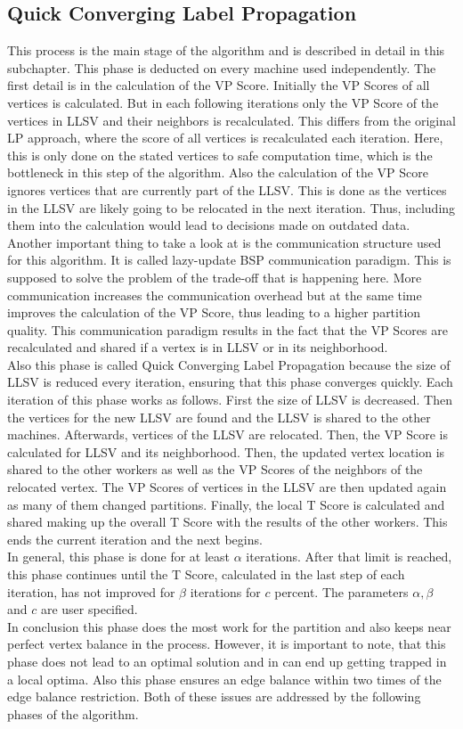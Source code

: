\documentclass[acmsmall,nonacm,screen,review]{acmart}
\begin{document}
\subsection{Quick Converging Label Propagation}
This process is the main stage of the algorithm and is described in detail in this subchapter. This phase is deducted on every machine used independently. The first detail is in the calculation of the VP Score. Initially the VP Scores of all vertices is calculated. But in each following iterations only the VP Score of the vertices in LLSV and their neighbors is recalculated. This differs from the original LP approach, where the score of all vertices is recalculated each iteration. Here, this is only done on the stated vertices to safe computation time, which is the bottleneck in this step of the algorithm. Also the calculation of the VP Score ignores vertices that are currently part of the LLSV. This is done as the vertices in the LLSV are likely going to be relocated in the next iteration. Thus, including them into the calculation would lead to decisions made on outdated data. \\
Another important thing to take a look at is the communication structure used for this algorithm. It is called lazy-update BSP communication paradigm. This is supposed to solve the problem of the trade-off that is happening here. More communication increases the communication overhead but at the same time improves the calculation of the VP Score, thus leading to a higher partition quality. This communication paradigm  results in the fact that the VP Scores are recalculated and shared if a vertex is in LLSV or in its neighborhood.\\
Also this phase is called Quick Converging Label Propagation because the size of LLSV is reduced every iteration, ensuring that this phase converges quickly. Each iteration of this phase works as follows. First the size of LLSV is decreased. Then the vertices for the new LLSV are found and the LLSV is shared to the other machines. Afterwards, vertices of the LLSV are relocated. Then, the VP Score is calculated for LLSV and its neighborhood. Then, the updated vertex location is shared to the other workers as well as the VP Scores of the neighbors of the relocated vertex. The VP Scores of vertices in the LLSV are then updated again as many of them changed partitions. Finally, the local T Score is calculated and shared making up the overall T Score with the results of the other workers. This ends the current iteration and the next begins.\\
In general, this phase is done for at least $\alpha$ iterations. After that limit is reached, this phase continues until the T Score, calculated in the last step of each iteration, has not improved for $\beta$ iterations for $c$ percent. The parameters $\alpha,\beta$ and $c$ are user specified.\\
In conclusion this phase does the most work for the partition and also keeps near perfect vertex balance in the process. However, it is important to note, that this phase does not lead to an optimal solution and in can end up getting trapped in a local optima. Also this phase ensures an edge balance within two times of the edge balance restriction. Both of these issues are addressed by the following phases of the algorithm.
\end{document}

